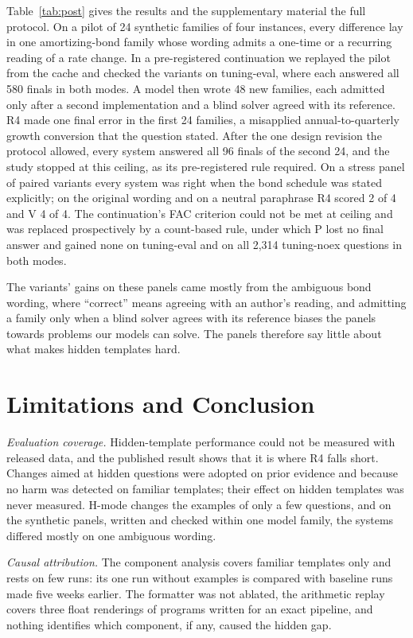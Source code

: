 \documentclass[conference]{IEEEtran}
\begin{document}
Table~\ref{tab:post} gives the results and the supplementary material the full protocol. On a pilot of 24 synthetic families of four instances, every difference lay in one amortizing-bond family whose wording admits a one-time or a recurring reading of a rate change. In a pre-registered continuation we replayed the pilot from the cache and checked the variants on tuning-eval, where each answered all 580 finals in both modes. A model then wrote 48 new families, each admitted only after a second implementation and a blind solver agreed with its reference. R4 made one final error in the first 24 families, a misapplied annual-to-quarterly growth conversion that the question stated. After the one design revision the protocol allowed, every system answered all 96 finals of the second 24, and the study stopped at this ceiling, as its pre-registered rule required. On a stress panel of paired variants every system was right when the bond schedule was stated explicitly; on the original wording and on a neutral paraphrase R4 scored 2 of 4 and V 4 of 4. The continuation's FAC criterion could not be met at ceiling and was replaced prospectively by a count-based rule, under which P lost no final answer and gained none on tuning-eval and on all 2,314 tuning-noex questions in both modes.

The variants' gains on these panels came mostly from the ambiguous bond wording, where ``correct'' means agreeing with an author's reading, and admitting a family only when a blind solver agrees with its reference biases the panels towards problems our models can solve. The panels therefore say little about what makes hidden templates hard.

\section{Limitations and Conclusion}
\emph{Evaluation coverage.} Hidden-template performance could not be measured with released data, and the published result shows that it is where R4 falls short. Changes aimed at hidden questions were adopted on prior evidence and because no harm was detected on familiar templates; their effect on hidden templates was never measured. H-mode changes the examples of only a few questions, and on the synthetic panels, written and checked within one model family, the systems differed mostly on one ambiguous wording.

\emph{Causal attribution.} The component analysis covers familiar templates only and rests on few runs: its one run without examples is compared with baseline runs made five weeks earlier. The formatter was not ablated, the arithmetic replay covers three float renderings of programs written for an exact pipeline, and nothing identifies which component, if any, caused the hidden gap.
\end{document}
